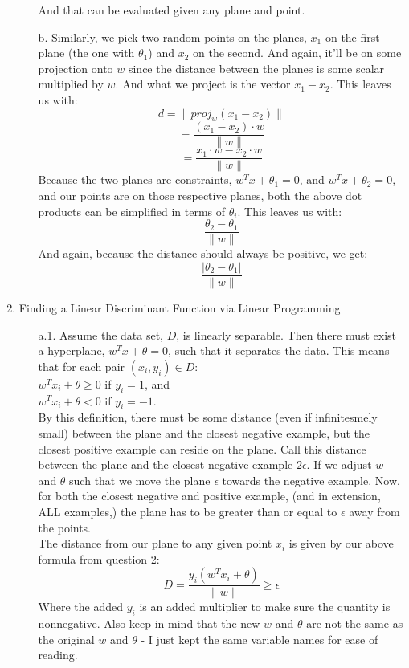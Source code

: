 \begin{enumerate}
\begin{enumerate}
			And that can be evaluated given any plane and point.
		\item[b.]
			Similarly, we pick two random points on the planes, $x_1$ on the first plane (the one with $\theta _1$) and $x_2$ on the second. And again, it'll be on some projection onto $w$ since the distance between the planes is some scalar multiplied by $w$. And what we project is the vector $x_1-x_2$. This leaves us with:
			$$d=\|proj_{w}(x_1-x_2)\|$$
			$$=\frac{(x_1-x_2)\cdot w}{\|w\|}$$
			$$=\frac{x_1 \cdot w - x_2 \cdot w}{\|w\|}$$
			Because the two planes are constraints, $w^T x + \theta _1 = 0$, and $w^T x + \theta _2 = 0$, and our points are on those respective planes, both the above dot products can be simplified in terms of $\theta _i$. This leaves us with:
			$$\frac{\theta _2 - \theta _1}{\|w\|}$$
			And again, because the distance should always be positive, we get:
			$$\frac{|\theta _2 - \theta _1|}{\|w\|}$$
	\end{enumerate}
\item Finding a Linear Discriminant Function via Linear Programming
      \begin{enumerate}
        \item[a.1.]
                Assume the data set, $D$, is linearly separable. Then there must exist a hyperplane, $w^Tx+\theta=0$, such that it separates the data. This means that for each pair $(x_i,y_i) \in D$:\\
                $w^Tx_i+\theta \geq 0$ if $y_i = 1$, and \\ 
                $w^Tx_i+\theta < 0$ if $y_i = -1$. \\
                By this definition, there must be some distance (even if infinitesmely small) between the plane and the closest negative example, but the closest positive example can reside on the plane. Call this distance between the plane and the closest negative example $2\epsilon$. If we adjust $w$ and $\theta$ such that we move the plane $\epsilon$ towards the negative example. Now, for both the closest negative and positive example, (and in extension, ALL examples,) the plane has to be greater than or equal to $\epsilon$ away from the points.\\
                The distance from our plane to any given point $x_i$ is given by our above formula from question 2:
                $$D = \frac{y_i(w^Tx_i+\theta)}{\|w\|} \geq \epsilon$$
                Where the added $y_i$ is an added multiplier to make sure the quantity is nonnegative. Also keep in mind that the new $w$ and $\theta$ are not the same as the original $w$ and $\theta$ - I just kept the same variable names for ease of reading.\\\\

\end{enumerate}
\end{enumerate}
